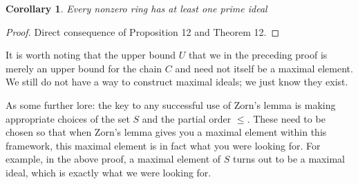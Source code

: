 \documentclass[12pt,reqno]{amsart}
\theoremstyle{plain}
\newtheorem{coro}{Corollary}
\begin{document}
\begin{coro} Every nonzero ring has at least one prime ideal
\end{coro}
\begin{proof} Direct consequence of Proposition 12 and Theorem 12.
\end{proof}
It is worth noting that the upper bound $U$ that we in the preceding proof is merely an upper bound for the chain $C$ and need not itself be a maximal element. We still do not have a way to construct maximal ideals; we just know they exist. 

As some further lore: the key to any successful use of Zorn's lemma is making appropriate choices of the set $S$ and the partial order $\leq$. These need to be chosen so that when Zorn's lemma gives you a maximal element within this framework, this maximal element is in fact what you were looking for. For example, in the above proof, a maximal element of $S$ turns out to be a maximal ideal, which is exactly what we were looking for. 
\end{document}
